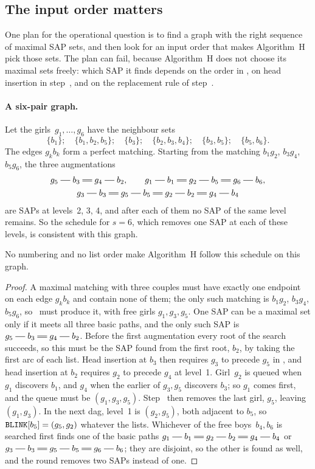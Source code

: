 \subsection{The input order matters}
\label{sec:order}

One plan for the operational question is to find a graph with the right
sequence of maximal SAP sets, and then look for an input order that makes
Algorithm~H pick those sets. The plan can fail, because Algorithm~H does
not choose its maximal sets freely: which SAP it finds depends on the
order in , on head insertion in step~, and on the replacement
rule of step~.

\paragraph{A six-pair graph.}
Let the girls~$g_1,\ldots,g_6$ have the neighbour sets
\[
  \{b_1\};\quad\{b_1,b_2,b_5\};\quad\{b_3\};\quad\{b_2,b_3,b_4\};\quad\{b_3,b_5\};\quad\{b_5,b_6\}.
\]
The edges $g_kb_k$ form a perfect matching. Starting from the matching
$b_1g_2$, $b_3g_4$, $b_5g_6$, the three augmentations
\begin{gather*}
  g_5\sg b_3\db g_4\sg b_2,\qquad
  g_1\sg b_1\db g_2\sg b_5\db g_6\sg b_6,\\
  g_3\sg b_3\db g_5\sg b_5\db g_2\sg b_2\db g_4\sg b_4
\end{gather*}
are SAPs at levels~2, 3, 4, and after each of them no SAP of the same level
remains. So the schedule for $s=6$, which removes one SAP at each of these
levels, is consistent with this graph.

\begin{proposition}
No numbering and no list order make Algorithm~H follow this schedule on
this graph.
\end{proposition}

\begin{proof}
A maximal matching with three couples must have exactly one endpoint on
each edge $g_kb_k$ and contain none of them; the only such matching is
$b_1g_2$, $b_3g_4$, $b_5g_6$, so~ must produce it, with free girls
$g_1,g_3,g_5$. One SAP can be a maximal set only if it meets all three
basic paths, and the only such SAP is $g_5\sg b_3\db g_4\sg b_2$. Before
the first augmentation every root of the search succeeds, so this must be
the SAP found from the first root, $b_2$, by taking the first arc of each
list. Head insertion at $b_3$ then requires $g_3$ to precede $g_5$ in
, and head insertion at $b_2$ requires $g_2$ to precede $g_4$ at
level~1. Girl~$g_2$ is queued when $g_1$ discovers $b_1$, and $g_4$ when the
earlier of $g_3,g_5$ discovers $b_3$; so $g_1$ comes first, and the queue
must be $(g_1,g_3,g_5)$. Step~ then removes the last girl, $g_5$,
leaving $(g_1,g_3)$. In the next dag, level~1 is $(g_2,g_5)$, both adjacent
to $b_5$, so $\texttt{BLINK}[b_5]=(g_5,g_2)$ whatever the lists. Whichever of the
free boys~$b_4,b_6$ is searched first finds one of the basic paths
$g_1\sg b_1\db g_2\sg b_2\db g_4\sg b_4$ or $g_3\sg b_3\db g_5\sg b_5\db
g_6\sg b_6$; they are disjoint, so the other is found as well, and the round
removes two SAPs instead of one.
\end{proof}

